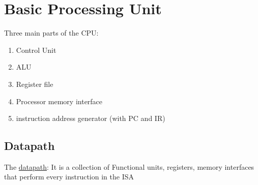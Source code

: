 \documentclass[10pt]{article}
\begin{document}
\section*{Basic Processing Unit}
Three main parts of the CPU:
\begin{enumerate}
    \item Control Unit
    \item ALU
    \item Register file
    \item Processor memory interface
    \item instruction address generator (with PC and IR)
\end{enumerate}
\subsection{Datapath}
The \underline{datapath}: It is a collection of Functional units, registers, memory interfaces that perform every instruction in the ISA\\
\end{document}
